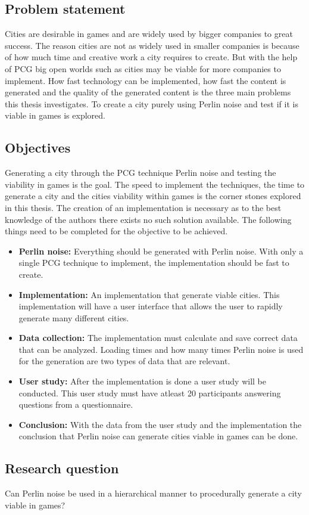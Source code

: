	\subsection{Problem statement}
	Cities are desirable in games and are widely used by bigger companies to great success. The reason cities are not as widely used in smaller companies is because of how much time and creative work a city requires to create. But with the help of PCG big open worlds such as cities may be viable for more companies to implement.
	How fast technology can be implemented, how fast the content is generated and the quality of the generated content is the three main problems this thesis investigates.
	To create a city purely using Perlin noise and test if it is viable in games is explored.
	
	\subsection{Objectives}
	Generating a city through the PCG technique Perlin noise and testing the viability in games is the goal. The speed to implement the techniques, the time to generate a city and the cities viability within games is the corner stones explored in this thesis. The creation of an implementation is necessary as to the best knowledge of the authors there exists no such solution available.
	The following things need to be completed for the objective to be achieved.
	
	\begin{itemize}
		\item \textbf{Perlin noise:} Everything should be generated with Perlin noise.
		With only a single PCG technique to implement, the implementation should be fast to create.
		
		\item \textbf{Implementation:} An implementation that generate viable cities. This implementation will have a user interface that allows the user to rapidly generate many different cities.
		
		\item \textbf{Data collection:} The implementation must calculate and save correct data that can be analyzed. Loading times and how many times Perlin noise is used for the generation are two types of data that are relevant.
		
		\item \textbf{User study:} After the implementation is done a user study will be conducted. This user study must have atleast 20 participants answering questions from a questionnaire.
		
		\item \textbf{Conclusion: } With the data from the user study and the implementation the conclusion that Perlin noise can generate cities viable in games can be done.
	\end{itemize} 
	
	\subsection{Research question}
	Can Perlin noise be used in a hierarchical manner to procedurally generate a city viable in games?
